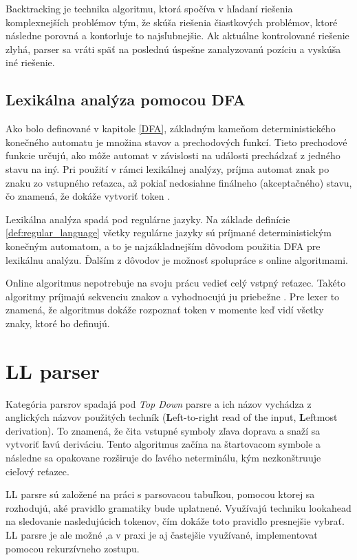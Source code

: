 Backtracking je technika algoritmu, ktorá spočíva v hľadaní riešenia komplexnejších problémov tým, že skúša riešenia čiastkových problémov, ktoré následne porovná a kontorluje to najsľubnejšie. Ak aktuálne kontrolované riešenie zlyhá, parser sa vráti späť na poslednú úspešne zanalyzovanú pozíciu a vyskúša iné riešenie.

\subsection{Lexikálna analýza pomocou DFA}
Ako bolo definované v kapitole \ref{DFA}, základným kameňom deterministického konečného automatu je množina stavov a prechodových funkcí. Tieto prechodové funkcie určujú, ako môže automat v závislosti na události prechádzať z jedného stavu na iný. Pri použití v rámci lexikálnej analýzy, príjma automat znak po znaku zo vstupného reťazca, až pokiaľ nedosiahne finálneho (akceptačného) stavu, čo znamená, že dokáže vytvoriť token \cite{roche1997finite}.

Lexikálna analýza spadá pod regulárne jazyky. Na základe definície \ref{def:regular_language} všetky regulárne jazyky sú príjmané deterministickým konečným automatom, a to je najzákladnejším dôvodom použitia DFA pre lexikálnu analýzu. Ďalším z dôvodov je možnosť spolupráce s online algoritmami.

Online algoritmus nepotrebuje na svoju prácu vedieť celý vstpný reťazec. Takéto algoritmy príjmajú sekvenciu znakov a vyhodnocujú ju priebežne \cite{karp1992line}. Pre lexer to znamená, že algoritmus dokáže rozpoznať token v momente keď vidí všetky znaky, ktoré ho definujú.

\section{LL parser}\label{LL}
Kategória  parsrov spadajá pod \textit{Top Down} parsre a ich názov vychádza z anglických názvov použitých techník (\textbf{L}eft-to-right read of the input, \textbf{L}eftmost derivation). To znamená, že čita vstupné symboly zľava doprava a snaží sa vytvoriť ľavú deriváciu. Tento algoritmus začína na štartovacom symbole a následne sa opakovane rozširuje do ľavého neterminálu, kým nezkonštruuje cieľový reťazec. 

LL parsre sú založené na práci s parsovacou tabuľkou, pomocou ktorej sa rozhodujú, aké pravidlo gramatiky bude uplatnené. Využívajú techniku lookahead na sledovanie nasledujúcich tokenov, čím dokáže toto pravidlo presnejšie vybrať. LL parsre je ale možné ,a v praxi je aj častejšie využívané, implementovat pomocou rekurzívneho zostupu.

